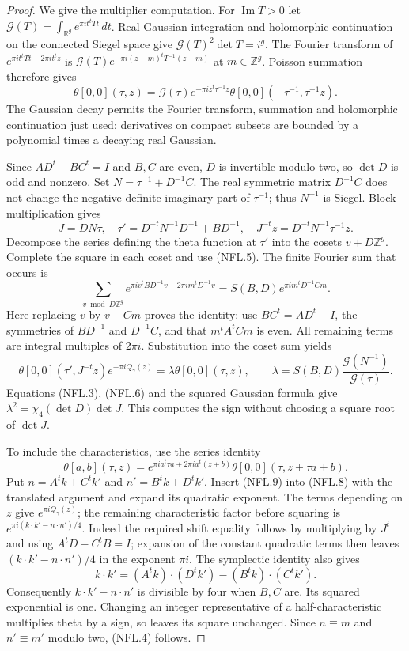 \documentclass[11pt,a4paper]{article}
\numberwithin{equation}{section}
\theoremstyle{remark}\newtheorem{remark}[theorem]{Remark}
\begin{document}
\begin{proof}
We give the multiplier computation.  For $\operatorname{Im}T>0$ let
$\mathcal G(T)=\int_{\mathbb R^g}e^{\pi it^tTt}\,dt$.
Real Gaussian integration and holomorphic continuation on the
connected Siegel space give
$\mathcal G(T)^2\det T=i^g$.
The Fourier transform of $e^{\pi it^tTt+2\pi it^tz}$ is
$\mathcal G(T)e^{-\pi i(z-m)^tT^{-1}(z-m)}$ at $m\in\mathbb Z^g$.
Poisson summation therefore gives
\[
 \theta[0,0](\tau,z)=\mathcal G(\tau)
 e^{-\pi iz^t\tau^{-1}z}
 \theta[0,0](-\tau^{-1},\tau^{-1}z).
 \tag{NFL.5}
\]
The Gaussian decay permits the Fourier transform, summation and
holomorphic continuation just used; derivatives on compact subsets
are bounded by a polynomial times a decaying real Gaussian.

Since $AD^t-BC^t=I$ and $B,C$ are even, $D$ is invertible modulo
two, so $\det D$ is odd and nonzero.  Set
$N=\tau^{-1}+D^{-1}C$.  The real symmetric matrix $D^{-1}C$
does not change the negative definite imaginary part of $\tau^{-1}$;
thus $N^{-1}$ is Siegel.  Block multiplication gives
\[
 J=DN\tau,\quad
 \tau'=D^{-t}N^{-1}D^{-1}+BD^{-1},\quad
 J^{-t}z=D^{-t}N^{-1}\tau^{-1}z.
 \tag{NFL.6}
\]
Decompose the series defining the theta function at $\tau'$ into
the cosets $v+D\mathbb Z^g$.  Complete the square in each coset
and use (NFL.5).  The finite Fourier sum that occurs is
\[
 \sum_{v\bmod D\mathbb Z^g}
 e^{\pi iv^tBD^{-1}v+2\pi im^tD^{-1}v}
   =S(B,D)e^{\pi im^tD^{-1}Cm}.
 \tag{NFL.7}
\]
Here replacing $v$ by $v-Cm$ proves the identity: use
$BC^t=AD^t-I$, the symmetries of $BD^{-1}$ and $D^{-1}C$,
and that $m^tA^tCm$ is even.  All remaining terms are integral
multiples of $2\pi i$.  Substitution into the coset sum yields
\[
 \theta[0,0](\tau',J^{-t}z)e^{-\pi iQ_\gamma(z)}
   =\lambda\theta[0,0](\tau,z),\qquad
 \lambda=S(B,D)\frac{\mathcal G(N^{-1})}{\mathcal G(\tau)}.
 \tag{NFL.8}
\]
Equations (NFL.3), (NFL.6) and the squared Gaussian formula give
$\lambda^2=\chi_4(\det D)\det J$.  This computes the sign without
choosing a square root of $\det J$.

To include the characteristics, use the series identity
\[
 \theta[a,b](\tau,z)=
 e^{\pi ia^t\tau a+2\pi ia^t(z+b)}
 \theta[0,0](\tau,z+\tau a+b).
 \tag{NFL.9}
\]
Put $n=A^tk+C^tk'$ and $n'=B^tk+D^tk'$.
Insert (NFL.9) into (NFL.8) with the translated argument and
expand its quadratic exponent.  The terms depending on $z$ give
$e^{\pi iQ_\gamma(z)}$; the remaining characteristic factor before
squaring is $e^{\pi i(k\cdot k'-n\cdot n')/4}$.
Indeed the required shift equality follows by multiplying by
$J^t$ and using $A^tD-C^tB=I$; expansion of the constant
quadratic terms then leaves $(k\cdot k'-n\cdot n')/4$ in the
exponent $\pi i$.  The symplectic identity also gives
\[
 k\cdot k'=(A^tk)\cdot(D^tk')-(B^tk)\cdot(C^tk').
\]
Consequently $k\cdot k'-n\cdot n'$ is divisible by four when
$B,C$ are.  Its squared exponential is one.  Changing an integer
representative of a half-characteristic multiplies theta by a
sign, so leaves its square unchanged.  Since
$n\equiv m$ and $n'\equiv m'$ modulo two, (NFL.4) follows.
\end{proof}
\end{document}
